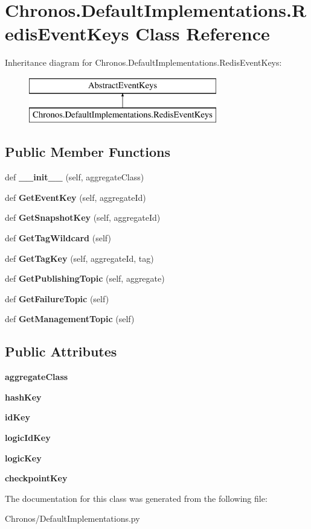 \hypertarget{classChronos_1_1DefaultImplementations_1_1RedisEventKeys}{}\section{Chronos.\+Default\+Implementations.\+Redis\+Event\+Keys Class Reference}
\label{classChronos_1_1DefaultImplementations_1_1RedisEventKeys}
Inheritance diagram for Chronos.\+Default\+Implementations.\+Redis\+Event\+Keys\+:\begin{figure}[H]
\begin{center}
\leavevmode
\includegraphics[height=2.000000cm]{classChronos_1_1DefaultImplementations_1_1RedisEventKeys}
\end{center}
\end{figure}
\subsection*{Public Member Functions}
\begin{DoxyCompactItemize}
\item 
def {\bfseries \+\_\+\+\_\+init\+\_\+\+\_\+} (self, aggregate\+Class)
\item 
def {\bfseries Get\+Event\+Key} (self, aggregate\+Id)
\item 
def {\bfseries Get\+Snapshot\+Key} (self, aggregate\+Id)
\item 
def {\bfseries Get\+Tag\+Wildcard} (self)
\item 
def {\bfseries Get\+Tag\+Key} (self, aggregate\+Id, tag)
\item 
def {\bfseries Get\+Publishing\+Topic} (self, aggregate)
\item 
def {\bfseries Get\+Failure\+Topic} (self)
\item 
def {\bfseries Get\+Management\+Topic} (self)
\end{DoxyCompactItemize}
\subsection*{Public Attributes}
\begin{DoxyCompactItemize}
\item 
{\bfseries aggregate\+Class}
\item 
{\bfseries hash\+Key}
\item 
{\bfseries id\+Key}
\item 
{\bfseries logic\+Id\+Key}
\item 
{\bfseries logic\+Key}
\item 
{\bfseries checkpoint\+Key}
\end{DoxyCompactItemize}


The documentation for this class was generated from the following file\+:\begin{DoxyCompactItemize}
\item 
Chronos/Default\+Implementations.\+py\end{DoxyCompactItemize}
